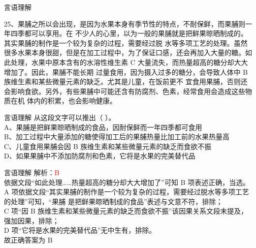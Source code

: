\documentclass[aspectratio=169]{beamer}
\begin{document}
\begin{frame}[t]{言语理解}

25、果脯之所以会出现，是因为水果本身有季节性的特点，不耐保鲜，而果脯则一年四季都可以享用。在
不少人的心里，以为一般的果脯就是把鲜果晾晒制成的。其实果脯的制作是一个较为复杂的过程，需要经过脱
水等多项工艺的处理。虽然很多水果本身很甜，但是在加工过程中，为了保证口感，还会再加入大量的糖。如
此处理，水果中原本含有的水溶性维生素 C 大量流失，而热量超高的糖分却大大增加了。因此，果脯不能长期
过量食用，因为摄入过多的糖分，会导致人体中 B 族维生素和某些微量元素的缺乏。尤其是儿童，在饭前更不
宜食用果脯，否则还会影响食欲。另外，有些果脯中可能还含有防腐剂、色素，经常食用会造成这些物质在机
体内的积累，也会影响健康。\\
\end{frame}



\begin{frame}[t]{言语理解}
从这段文字可以推出（ ）。\\
A、果脯是把鲜果晾晒制成的食品，因耐保鲜而一年四季都可食用\\
B、加工过程中大量添加的糖使得加工后的果脯热量比加工前的水果热量高\\
C、儿童食用果脯会因 B 族维生素和某些微量元素的缺乏而食欲不振\\
D、如果果脯中不添加防腐剂和色素，它将是水果的完美替代品\\

\end{frame}



\begin{frame}[t]{言语理解}
    解析：\textcolor{red}{B}\\
    依据文段“如此处理……热量超高的糖分却大大增加了”可知 B 项表述正确，当选。\\
A 项依据文段“其实果脯的制作是一个较为复杂的过程，需要经过脱水等多项工艺的处理”可知，“果脯
是把鲜果晾晒制成的食品”表述与文意不符，排除；\\
C 项“因 B 族维生素和某些微量元素的缺乏而食欲不振”该因果关系文段未提及，强加因果，排除；\\
D 项“它将是水果的完美替代品”无中生有，排除。\\
故正确答案为 B
\end{frame}
\end{document}
